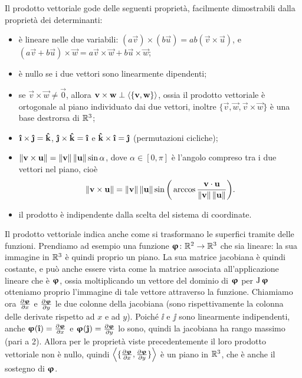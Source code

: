 Il prodotto vettoriale gode delle seguenti proprietà, facilmente dimostrabili dalla proprietà dei determinanti:
\begin{itemize}
	\item è lineare nelle due variabili: $(a\vec v)\times(b\vec u)=ab(\vec v\times\vec u)$, e $(a\vec v+b\vec u)\times\vec w=a\vec v\times\vec w+b\vec u\times\vec w$;
	\item è nullo se i due vettori sono linearmente dipendenti;
	\item se $\vec v\times\vec w\neq\vec 0$, allora $\mathbf{v}\times\mathbf{w}\perp\left\langle{\{\mathbf{v},\mathbf{w}\}}\right\rangle$, ossia il prodotto vettoriale è ortogonale al piano individuato dai due vettori, inoltre $\{\vec v,\vec w,\vec v\times\vec w\}$ è una base destrorsa di $\mathbb{R}^3$;
	\item $\ii\times\jj=\kk$, $\jj\times\kk=\ii$ e $\kk\times\ii=\jj$ (permutazioni cicliche);
	\item $\left\|{\mathbf{v}\times\mathbf{u}}\right\|=\left\|{\mathbf{v}}\right\|\left\|{\mathbf{u}}\right\|\sin\alpha$, dove $\alpha\in[0,\pi]$ è l'angolo compreso tra i due vettori nel piano, cioè
		\begin{equation}
			\left\|{\mathbf{v}\times\mathbf{u}}\right\|=\left\|{\mathbf{v}}\right\|\left\|{\mathbf{u}}\right\|\sin\bigg(\arccos\frac{{\mathbf{v}}\cdot{\mathbf{u}}}{\left\|{\mathbf{v}}\right\|\left\|{\mathbf{u}}\right\|}\bigg).
		\end{equation}
	\item il prodotto è indipendente dalla scelta del sistema di coordinate.
\end{itemize}
Il prodotto vettoriale indica anche come si trasformano le superfici tramite delle funzioni.
Prendiamo ad esempio una funzione $\bm{\upvarphi}\colon\mathbb{R}^2\to\mathbb{R}^3$ che sia lineare: la sua immagine in $\mathbb{R}^3$ è quindi proprio un piano.
La sua matrice jacobiana è quindi costante, e può anche essere vista come la matrice associata all'applicazione lineare che è $\bm{\upvarphi}$, ossia moltiplicando un vettore del dominio di $\bm{\upvarphi}$ per $\operatorname{J}{\bm{\upvarphi}}$ otteniamo proprio l'immagine di tale vettore attraverso la funzione.
Chiamiamo ora $\frac{\partial {\bm{\upvarphi}}}{\partial {x}}$ e $\frac{\partial {\bm{\upvarphi}}}{\partial {y}}$ le due colonne della jacobiana (sono rispettivamente la colonna delle derivate rispetto ad $x$ e ad $y$).
Poich\'e $\ii$ e $\jj$ sono linearmente indipendenti, anche $\vphi(\ii)=\drp{\vphi}{x}$ e $\vphi(\jj)=\drp{\vphi}{y}$ lo sono, quindi la jacobiana ha rango massimo (pari a 2).
Allora per le proprietà viste precedentemente il loro prodotto vettoriale non è nullo, quindi $\left\langle{\{\frac{\partial {\bm{\upvarphi}}}{\partial {x}},\frac{\partial {\bm{\upvarphi}}}{\partial {y}}\}}\right\rangle$ è un piano in $\mathbb{R}^3$, che è anche il sostegno di $\bm{\upvarphi}$.

